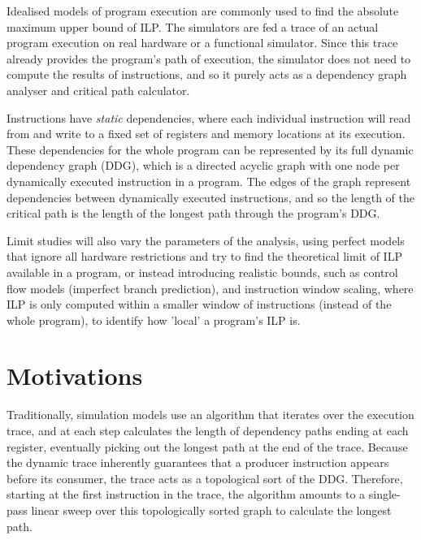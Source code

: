 Idealised models of program execution are commonly used to find the absolute maximum upper bound of ILP. The simulators 
are fed a trace of an actual program execution on real hardware or a functional simulator. Since this trace already 
provides the program's path of execution, the simulator does not need to compute the results of instructions, and so it
purely acts as a dependency graph analyser and critical path calculator.

Instructions have \textit{static} dependencies, where each individual instruction will read from and write to a fixed 
set of registers and memory locations at its execution. These dependencies for the whole program can be represented by 
its full dynamic dependency graph (DDG), which is a directed acyclic graph with one node per dynamically executed 
instruction in a program. The edges of the graph represent dependencies between dynamically executed instructions,
and so the length of the critical path is the length of the longest path through the program's DDG.


Limit studies will also vary the parameters of the analysis, using perfect models that ignore all hardware restrictions
and try to find the theoretical limit of ILP available in a program, or instead introducing realistic bounds, such as
control flow models (imperfect branch prediction), and instruction window scaling, where ILP is only computed within a
smaller window of instructions (instead of the whole program), to identify how 'local' a program's ILP is.

\section{Motivations}



Traditionally, simulation models use an algorithm that iterates over the execution trace, and at each step calculates 
the length of dependency paths ending at each register, eventually picking out the longest path at the end of the trace.
Because the dynamic trace inherently guarantees that a producer instruction appears before its consumer,
the trace acts as a topological sort of the DDG. Therefore, starting at the first instruction in the trace,
the algorithm amounts to a single-pass linear sweep over this topologically sorted graph to calculate the longest path.

